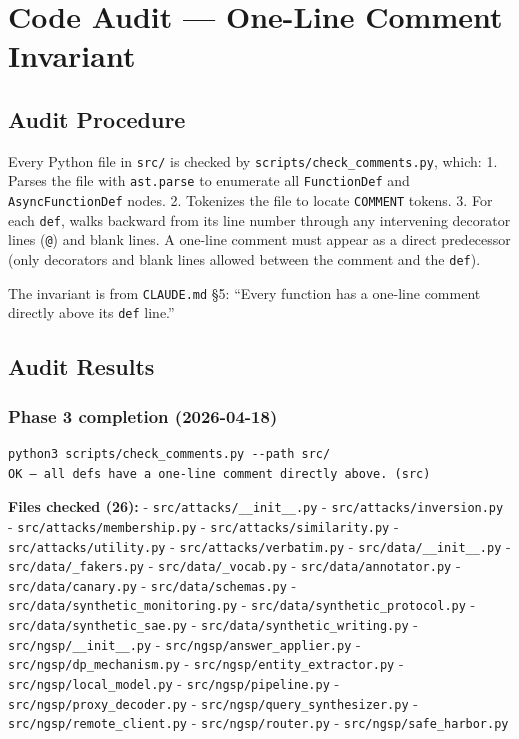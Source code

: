 \section{Code Audit --- One-Line Comment
Invariant}\label{code-audit-one-line-comment-invariant}

\subsection{Audit Procedure}\label{audit-procedure}

Every Python file in \texttt{src/} is checked by
\texttt{scripts/check\_comments.py}, which: 1. Parses the file with
\texttt{ast.parse} to enumerate all \texttt{FunctionDef} and
\texttt{AsyncFunctionDef} nodes. 2. Tokenizes the file to locate
\texttt{COMMENT} tokens. 3. For each \texttt{def}, walks backward from
its line number through any intervening decorator lines (\texttt{@}) and
blank lines. A one-line comment must appear as a direct predecessor
(only decorators and blank lines allowed between the comment and the
\texttt{def}).

The invariant is from \texttt{CLAUDE.md} §5: ``Every function has a
one-line comment directly above its \texttt{def} line.''

\subsection{Audit Results}\label{audit-results}

\subsubsection{Phase 3 completion
(2026-04-18)}\label{phase-3-completion-2026-04-18}

\begin{verbatim}
python3 scripts/check_comments.py --path src/
OK — all defs have a one-line comment directly above. (src)
\end{verbatim}

\textbf{Files checked (26):} - \texttt{src/attacks/\_\_init\_\_.py} -
\texttt{src/attacks/inversion.py} - \texttt{src/attacks/membership.py} -
\texttt{src/attacks/similarity.py} - \texttt{src/attacks/utility.py} -
\texttt{src/attacks/verbatim.py} - \texttt{src/data/\_\_init\_\_.py} -
\texttt{src/data/\_fakers.py} - \texttt{src/data/\_vocab.py} -
\texttt{src/data/annotator.py} - \texttt{src/data/canary.py} -
\texttt{src/data/schemas.py} -
\texttt{src/data/synthetic\_monitoring.py} -
\texttt{src/data/synthetic\_protocol.py} -
\texttt{src/data/synthetic\_sae.py} -
\texttt{src/data/synthetic\_writing.py} -
\texttt{src/ngsp/\_\_init\_\_.py} - \texttt{src/ngsp/answer\_applier.py}
- \texttt{src/ngsp/dp\_mechanism.py} -
\texttt{src/ngsp/entity\_extractor.py} -
\texttt{src/ngsp/local\_model.py} - \texttt{src/ngsp/pipeline.py} -
\texttt{src/ngsp/proxy\_decoder.py} -
\texttt{src/ngsp/query\_synthesizer.py} -
\texttt{src/ngsp/remote\_client.py} - \texttt{src/ngsp/router.py} -
\texttt{src/ngsp/safe\_harbor.py}

